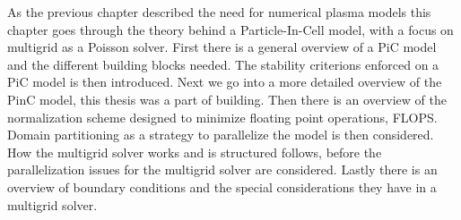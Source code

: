 
As the previous chapter described the need for numerical plasma models this chapter
goes through the theory behind a Particle-In-Cell model, with a focus on
multigrid as a Poisson solver.
First there is a general overview of a PiC model and the different building blocks
needed. The stability criterions enforced on a PiC model is then introduced.
Next we go into a more detailed overview of the PinC model, this thesis was a part of
building.
Then there is an overview of the normalization scheme designed to minimize
floating point operations, FLOPS. Domain partitioning as a strategy to parallelize
the model is then considered. How the multigrid solver works and is structured follows,
before the parallelization issues for the multigrid solver are considered.
Lastly there is an overview of boundary conditions and the special considerations
they have in a multigrid solver.
